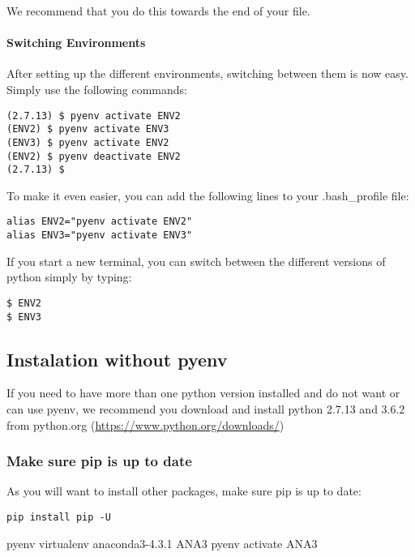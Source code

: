 We recommend that you do this towards the end of your file.

\paragraph{Switching Environments}\label{switching-environments}

After setting up the different environments, switching between them is
now easy. Simply use the following commands:

\begin{verbatim}
(2.7.13) $ pyenv activate ENV2
(ENV2) $ pyenv activate ENV3
(ENV3) $ pyenv activate ENV2
(ENV2) $ pyenv deactivate ENV2
(2.7.13) $ 
\end{verbatim}

To make it even easier, you can add the following lines to your
.bash\_profile file:

\begin{verbatim}
alias ENV2="pyenv activate ENV2"
alias ENV3="pyenv activate ENV3"
\end{verbatim}

If you start a new terminal, you can switch between the different
versions of python simply by typing:

\begin{verbatim}
$ ENV2
$ ENV3
\end{verbatim}

\subsection{Instalation without
pyenv}\label{instalation-without-pyenv-1}

If you need to have more than one python version installed and do not
want or can use pyenv, we recommend you download and install python
2.7.13 and 3.6.2 from python.org
(\url{https://www.python.org/downloads/})

\subsubsection{Make sure pip is up to
date}\label{make-sure-pip-is-up-to-date}

As you will want to install other packages, make sure pip is up to date:

\begin{verbatim}
pip install pip -U
\end{verbatim}

pyenv virtualenv anaconda3-4.3.1 ANA3 pyenv activate ANA3

